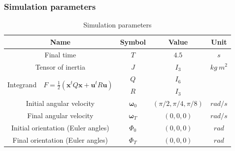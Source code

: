 \documentclass{beamer}
\begin{document}
\begin{frame} \frametitle{Simulation parameters}
	{\tiny
		\begin{table}
			\centering
			\begin{tabular}{cccc}
				\toprule
				\textbf{Name} & \textbf{Symbol} & \textbf{Value} & \textbf{Unit} \\
				\midrule
				Final time & $T$ & $4.5$ & $s$ \\
				Tensor of inertia & $J$ & $I_3$ & $kg\ m^2$ \\
				\multirow{2}{*}{ Integrand\ \
					$F = \frac{1}{2}( \bm{x}^tQ\bm{x} + \bm{u}^tR\bm{u})$ } & $Q$ & $I_6$ & \\
				& $R$ & $I_3$ & \\
				Initial angular velocity & $\bm{\omega}_0$ & $(\pi/2,\pi/4,\pi/8)$ & $rad/s$ \\
				Final angular velocity & $\bm{\omega}_T$ & $(0,0,0)$ & $rad/s$ \\
				Initial orientation (Euler angles) & $\Phi_0$ & $(0,0,0)$ & $rad$ \\
				Final orientation (Euler angles) & $\Phi_T$ & $(0,0,0)$ & $rad$ \\
				\bottomrule
			\end{tabular}
			\caption{Simulation parameters}
		\end{table}
	}
\end{frame}
\end{document}
